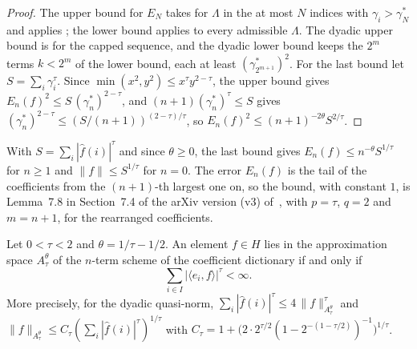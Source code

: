 \begin{proof}
\leanok
The upper bound for $E_N$ takes for $\Lambda$ in  the at most
$N$ indices with $\gamma_i > \gamma^*_N$ and applies ;
the lower bound applies  to every admissible
$\Lambda$. The dyadic upper bound is  for the capped sequence, and the
dyadic lower bound keeps the $2^m$ terms $k < 2^m$ of the lower bound, each at least
$(\gamma^*_{2^{m+1}})^2$. For the last bound let $S = \sum_i \gamma_i^\tau$. Since
$\min(x^2, y^2) \leq x^\tau y^{2-\tau}$, the upper bound gives
$E_n(f)^2 \leq S \, (\gamma^*_n)^{2-\tau}$, and $(n + 1) (\gamma^*_n)^\tau \leq S$ gives
$(\gamma^*_n)^{2-\tau} \leq (S/(n + 1))^{(2-\tau)/\tau}$, so
$E_n(f)^2 \leq (n + 1)^{-2\theta} S^{2/\tau}$.
\end{proof}

With $S = \sum_i |\hat f(i)|^\tau$ and since $\theta \geq 0$, the last bound gives
$E_n(f) \leq n^{-\theta} S^{1/\tau}$ for $n \geq 1$ and $\|f\| \leq S^{1/\tau}$ for $n = 0$.
The error $E_n(f)$ is the tail of the coefficients from the $(n+1)$-th largest one on, so the
bound, with constant $1$, is Lemma~7.8 in Section~7.4 of the arXiv version (v3)
of~\cite{DungTemlyakovUllrich}, with $p = \tau$, $q = 2$ and $m = n + 1$, for the rearranged
coefficients.

\begin{theorem}
\label{thm:stechkin}
\leanok
{}
Let $0 < \tau < 2$ and $\theta = 1/\tau - 1/2$. An element $f \in H$ lies in the
approximation space $A^\theta_\tau$ of the $n$-term scheme of the coefficient dictionary if
and only if
\[
  \sum_{i \in I} |\langle e_i, f \rangle|^\tau < \infty .
\]
More precisely, for the dyadic quasi-norm,
$\sum_i |\hat f(i)|^\tau \leq 4 \, \|f\|_{A^\theta_\tau}^\tau$ and
$\|f\|_{A^\theta_\tau} \leq C_\tau (\sum_i |\hat f(i)|^\tau)^{1/\tau}$ with
$C_\tau = 1 + \bigl(2 \cdot 2^{\tau/2} (1 - 2^{-(1 - \tau/2)})^{-1}\bigr)^{1/\tau}$.
\end{theorem}

